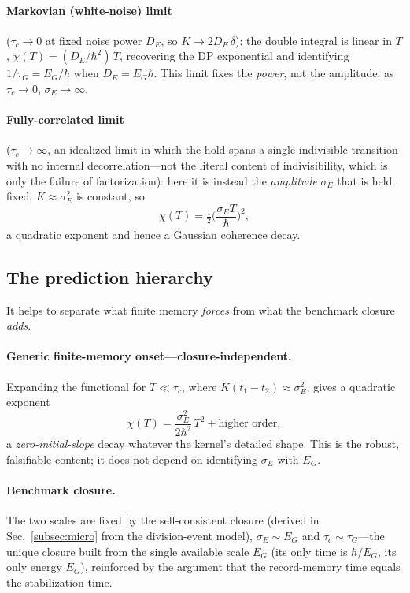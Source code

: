 \documentclass[aps,prd,onecolumn,amsmath,amssymb,nofootinbib,superscriptaddress]{revtex4-2}
\begin{document}
\paragraph{Markovian (white-noise) limit} ($\tau_c\to0$ at fixed noise power $D_E$, so
$K\to2D_E\,\delta$): the double integral is linear in $T$, $\chi(T)=(D_E/\hbar^2)\,T$, recovering the
DP exponential and identifying $1/\tau_G=E_G/\hbar$ when $D_E=E_G\hbar$. This limit fixes the
\emph{power}, not the amplitude: as $\tau_c\to0$, $\sigma_E\to\infty$.

\paragraph{Fully-correlated limit} ($\tau_c\to\infty$, an idealized limit in which the hold spans a
single indivisible transition with no internal decorrelation---not the literal content of
indivisibility, which is only the failure of factorization): here it is instead the \emph{amplitude}
$\sigma_E$ that is held fixed, $K\approx\sigma_E^2$ is constant, so
\begin{equation}
\chi(T)=\tfrac12\Big(\frac{\sigma_E T}{\hbar}\Big)^2,
\end{equation}
a quadratic exponent and hence a Gaussian coherence decay.

\subsection{The prediction hierarchy}\label{subsec:hierarchy}

It helps to separate what finite memory \emph{forces} from what the benchmark closure \emph{adds}.

\paragraph{Generic finite-memory onset---closure-independent.} Expanding the functional for
$T\ll\tau_c$, where $K(t_1-t_2)\approx\sigma_E^2$, gives a quadratic exponent
\begin{equation}
\boxed{\,\chi(T)=\frac{\sigma_E^2}{2\hbar^2}\,T^2 + \text{higher order},\,}
\end{equation}
a \emph{zero-initial-slope} decay whatever the kernel's detailed shape. This is the robust,
falsifiable content; it does not depend on identifying $\sigma_E$ with $E_G$.

\paragraph{Benchmark closure.} The two scales are fixed by the self-consistent closure (derived in
Sec.~\ref{subsec:micro} from the division-event model), $\sigma_E\sim E_G$ and $\tau_c\sim\tau_G$---the
unique closure built from the single available scale $E_G$ (its only time is $\hbar/E_G$, its only
energy $E_G$), reinforced by the argument that the record-memory time equals the stabilization time.
\end{document}
